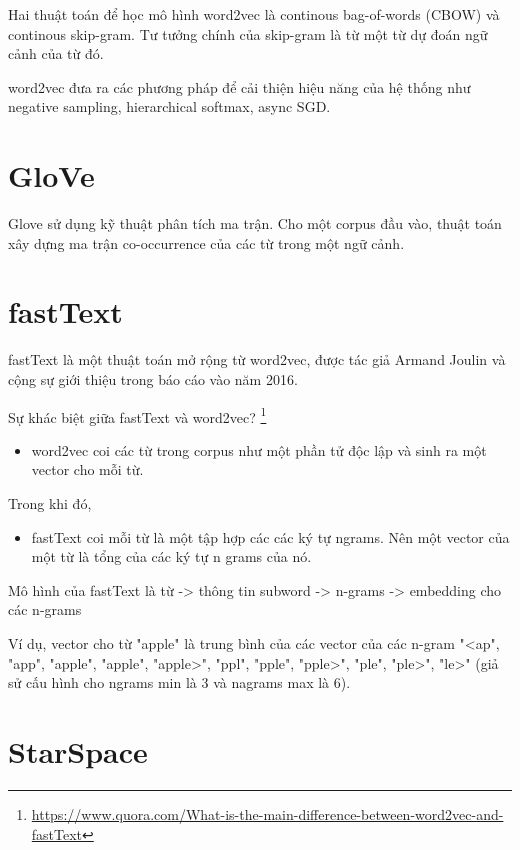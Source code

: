 \documentclass[11pt,a4paper]{article}
\begin{document}
Hai thuật toán để học mô hình word2vec là continous bag-of-words (CBOW) và continous skip-gram. Tư tưởng chính của skip-gram là từ một từ dự đoán ngữ cảnh của từ đó.

word2vec đưa ra các phương pháp để cải thiện hiệu năng của hệ thống như negative sampling, hierarchical softmax, async SGD.

\section{GloVe}

Glove \cite{DBLP:conf/emnlp/PenningtonSM14} sử dụng kỹ thuật phân tích ma trận. Cho một corpus đầu vào, thuật toán xây dựng ma trận co-occurrence của các từ trong một ngữ cảnh.

\section{fastText}

fastText \cite{DBLP:conf/eacl/GraveMJB17} là một thuật toán mở rộng từ word2vec, được tác giả Armand Joulin  và cộng sự giới thiệu trong báo cáo vào năm 2016.

Sự khác biệt giữa fastText và word2vec? \footnote{\href{https://www.quora.com/What-is-the-main-difference-between-word2vec-and-fastText}{https://www.quora.com/What-is-the-main-difference-between-word2vec-and-fastText}}

\begin{itemize}
  \item word2vec coi các từ trong corpus như một phần tử độc lập và sinh ra một vector cho mỗi từ.
\end{itemize}

Trong khi đó,

\begin{itemize}
  \item fastText coi mỗi từ là một tập hợp các các ký tự ngrams. Nên một vector của một từ là tổng của các ký tự n grams của nó.
\end{itemize}

Mô hình của fastText là từ -> thông tin subword -> n-grams -> embedding cho các n-grams

Ví dụ, vector cho từ "apple" là trung bình của các vector của các n-gram "<ap", "app", "apple", "apple", "apple>", "ppl", "pple", "pple>", "ple", "ple>", "le>" (giả sử cấu hình cho ngrams min là 3 và nagrams max là 6).

\section{StarSpace}
\end{document}
